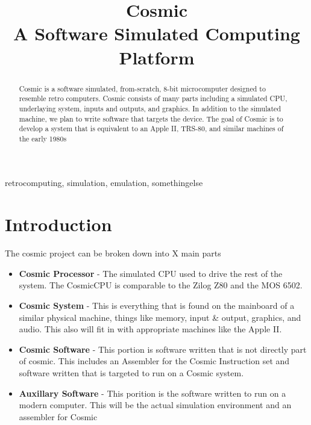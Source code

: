\documentclass[conference]{IEEEtran}
\begin{document}
\title{
 Cosmic\\A Software Simulated  Computing Platform}

\author{
\and
{}

}

\maketitle

\begin{abstract}
Cosmic is a software simulated, from-scratch, 8-bit microcomputer designed to resemble retro computers. Cosmic consists of many parts including a simulated CPU, underlaying system, inputs and outputs, and graphics. In addition to the simulated machine, we plan to write software that targets the device. The goal of Cosmic is to develop a system that is equivalent to an Apple II, TRS-80, and similar machines of the early 1980s
\end{abstract}

\begin{IEEEkeywords}
retrocomputing, simulation, emulation, somethingelse
\end{IEEEkeywords}

\section{Introduction}
The cosmic project can be broken down into X main parts
\begin{itemize}
	\item \textbf{Cosmic Processor} - The simulated CPU used to drive the rest of the system. The CosmicCPU is comparable to the Zilog Z80 and the MOS 6502.
	\item \textbf{Cosmic System} - This is everything that is found on the mainboard of a similar  physical machine, things like memory, input \& output, graphics, and audio. This also will fit in with appropriate machines like the Apple II.
	\item \textbf{Cosmic Software}  - This portion is software written that is not directly part of cosmic. This includes an Assembler for the Cosmic Instruction set and software written that is targeted to run on a Cosmic system.
	\item \textbf{Auxillary Software} - This porition is the software written to run on a modern computer. This will be the actual simulation environment and an assembler for Cosmic
\end{itemize}
\end{document}
